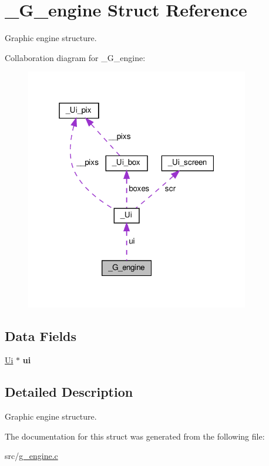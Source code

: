 \hypertarget{struct__G__engine}{}\section{\+\_\+\+G\+\_\+engine Struct Reference}
\label{struct__G__engine}


Graphic engine structure.  




Collaboration diagram for \+\_\+\+G\+\_\+engine\+:\nopagebreak
\begin{figure}[H]
\begin{center}
\leavevmode
\includegraphics[width=277pt]{struct__G__engine__coll__graph}
\end{center}
\end{figure}
\subsection*{Data Fields}
\begin{DoxyCompactItemize}
\item 
\mbox{\label{struct__G__engine_abf87df76723f99d4d39a4d5f629777cb}} 
\hyperlink{struct__Ui}{Ui} $\ast$ {\bfseries ui}
\end{DoxyCompactItemize}


\subsection{Detailed Description}
Graphic engine structure. 

The documentation for this struct was generated from the following file\+:\begin{DoxyCompactItemize}
\item 
src/\hyperlink{g__engine_8c}{g\+\_\+engine.\+c}\end{DoxyCompactItemize}
